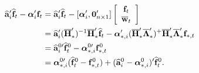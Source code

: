 \documentclass[12pt,fleqn]{article}
\begin{document}
\begin{align}
\widehat{\mathbf{a}}_{i}'\widehat{\mathbf{f}}_{t} - \boldsymbol{\alpha}_i'\mathbf{f}_t &= \widehat{\mathbf{a}}_{i}'\widehat{\mathbf{f}}_{t} - [\boldsymbol{\alpha}_i', \mathbf{0}_{n\times 1}']\left[ \begin{array}{c}
                          \mathbf{f}_t \\
                          \overline{\mathbf{w}}_t
                          \end{array}
\right] \notag\\
& =  \widehat{\mathbf{a}}_{i}'(\overline{\mathbf{H}}_*')^{-1}\overline{\mathbf{H}}_*'\widehat{\mathbf{f}}_{t} - \boldsymbol{\alpha}_{*,i}' (\overline{\mathbf{H}}_*'\overline{\boldsymbol{\Lambda}}_*')^+\overline{\mathbf{H}}_*'\overline{\boldsymbol{\Lambda}}_*'\mathbf{f}_{*,t} \notag\\
& = \widehat{\mathbf{a}}_{i}^{0\prime}\widehat{\mathbf{f}}_{t}^0 - \boldsymbol{\alpha}_{*,i}^{0\prime}\mathbf{f}_{*,t}^0 \notag\\
& = \boldsymbol{\alpha}_{*,i}^{0\prime}(\widehat{\mathbf{f}}_{t}^0-\mathbf{f}_{*,t}^0) + (\widehat{\mathbf{a}}_{i}^{0} - \boldsymbol{\alpha}_{*,i}^0)'\widehat{\mathbf{f}}_{t}^0.
\end{align}
\end{document}
